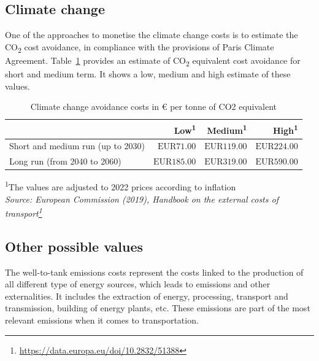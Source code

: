 \documentclass[
  11pt,
  a4paper,
]{book}
\DeclareRobustCommand{\href}[2]{#2\footnote{\url{#1}}}
\begin{document}
\hypertarget{climate-change}{%
\subsection{Climate change}\label{climate-change}}

One of the approaches to monetise the climate change costs is to
estimate the CO\textsubscript{2} cost avoidance, in compliance with the
provisions of Paris Climate Agreement.
Table~\ref{tbl-climate-change-cost} provides an estimate of
CO\textsubscript{2} equivalent cost avoidance for short and medium term.
It shows a low, medium and high estimate of these values.

\hypertarget{tbl-climate-change-cost}{}
\setlength{\LTpost}{0mm}
\begin{longtable}{lrrr}
\caption{\label{tbl-climate-change-cost}Climate change avoidance costs in € per tonne of CO2 equivalent }\tabularnewline

\toprule
  & Low\textsuperscript{1} & Medium\textsuperscript{1} & High\textsuperscript{1} \\ 
\midrule
Short and medium run (up to 2030) & $\text{EUR}71.00$ & $\text{EUR}119.00$ & $\text{EUR}224.00$ \\ 
Long run (from 2040 to 2060) & $\text{EUR}185.00$ & $\text{EUR}319.00$ & $\text{EUR}590.00$ \\ 
\bottomrule
\end{longtable}
\begin{minipage}{\linewidth}
\textsuperscript{1}The values are adjusted to 2022 prices according to inflation\\
\emph{Source: \href{https://data.europa.eu/doi/10.2832/51388}{European Commission (2019), Handbook on the external costs of transport}}\\
\end{minipage}

\hypertarget{other-possible-values}{%
\subsection{Other possible values}\label{other-possible-values}}

The well-to-tank emissions costs represent the costs linked to the
production of all different type of energy sources, which leads to
emissions and other externalities. It includes the extraction of energy,
processing, transport and transmission, building of energy plants, etc.
These emissions are part of the most relevant emissions when it comes to
transportation.
\end{document}
